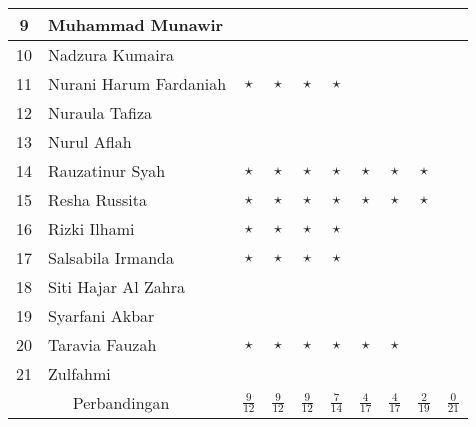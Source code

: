 \documentclass[a4paper]{tufte-handout}
\begin{document}
\begin{table}[!ht]
\begin{tabular}{cl|c|c|c|c|c|c|c|c}
9 	& Muhammad Munawir			& & & & & & & & \\ \hline
10 	& Nadzura Kumaira			& & & & & & & & \\ \hline
11 	& Nurani Harum Fardaniah	& $\star$ & $\star$ & $\star$ & $\star$ & & & & \\ \hline
12 	& Nuraula Tafiza			& & & & & & & & \\ \hline
13 	& Nurul Aflah				& & & & & & & & \\ \hline
14 	& Rauzatinur Syah			& $\star$ & $\star$ & $\star$ & $\star$ & $\star$ & $\star$ & $\star$ & \\ \hline
15 	& Resha Russita				& $\star$ & $\star$ & $\star$ & $\star$ & $\star$ & $\star$ & $\star$ & \\ \hline
16 	& Rizki Ilhami				& $\star$ & $\star$ & $\star$ & $\star$ & & & & \\ \hline
17 	& Salsabila Irmanda			& $\star$ & $\star$ & $\star$ & $\star$ & & & & \\ \hline
18 	& Siti Hajar Al Zahra		& & & & & & & & \\ \hline
19 	& Syarfani Akbar			& & & & & & & & \\ \hline
20 	& Taravia Fauzah			& $\star$ & $\star$ & $\star$ & $\star$ & $\star$ & $\star$ & & \\ \hline
21 	& Zulfahmi					& & & & & & & & \\ \hline
\multicolumn{2}{c|}{Perbandingan}		& 
$\frac{9}{12}$ &
$\frac{9}{12}$ &
$\frac{9}{12}$ &
$\frac{7}{14}$ &
$\frac{4}{17}$ &
$\frac{4}{17}$ &
$\frac{2}{19}$ &
$\frac{0}{21}$ \\
\end{tabular}
\end{table}

\end{document}
